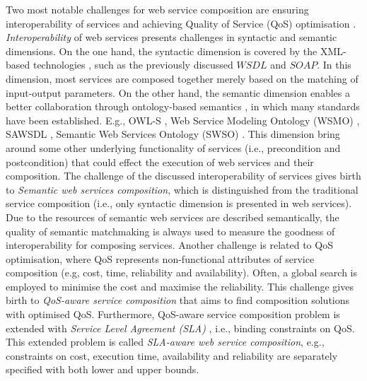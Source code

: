 Two most notable challenges for web service composition are ensuring interoperability of services and achieving Quality of Service (QoS) optimisation \cite{fensel2011semantic}. \emph{Interoperability} of web services presents challenges in syntactic and semantic dimensions. On the one hand, the syntactic dimension is covered by the XML-based technologies \cite{yu2008deploying}, such as the previously discussed $WSDL$ and $SOAP$. In this dimension, most services are composed together merely based on the matching of input-output parameters. On the other hand, the semantic dimension enables a better collaboration through ontology-based semantics \cite{o2005review}, in which many standards have been established. E.g., OWL-S \cite{martin2004owl}, Web Service Modeling Ontology (WSMO) \cite{lausen2005w3c}, SAWSDL \cite{kopecky2007sawsdl}, Semantic Web Services Ontology (SWSO) \cite{petrie2016web}. This dimension bring around some other underlying functionality of services (i.e., precondition and postcondition) that could effect the execution of web services and their composition. The challenge of the discussed interoperability of services gives birth to \emph{Semantic web services composition}, which is distinguished from the traditional service composition (i.e., only syntactic dimension is presented in web services). Due to the resources of semantic web services are described semantically, the quality of semantic matchmaking is always used to measure the goodness of interoperability for composing services. Another challenge is related to QoS optimisation, where QoS represents non-functional attributes of service composition (e.g, cost, time, reliability and availability). Often, a global search is employed to minimise the cost and maximise the reliability. This challenge gives birth to \emph{QoS-aware service composition} that aims to find composition solutions with optimised QoS. Furthermore, QoS-aware service composition problem is extended with \emph{Service Level Agreement (SLA)} \cite{sahai2002automated}, i.e., binding constraints on QoS. This extended problem is called \emph{SLA-aware web service composition}, e.g., constraints on cost, execution time, availability and reliability are separately specified with both lower and upper bounds.



